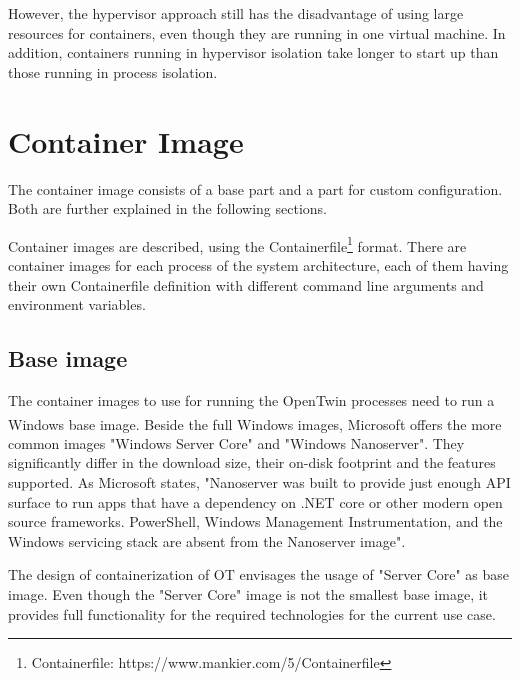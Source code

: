 However, the hypervisor approach still has the disadvantage of using large resources for containers, even though they are running in one virtual machine. In addition, containers running in hypervisor isolation take longer to start up than those running in process isolation\cite{RamosApolinario.2021}.




\section{Container Image}
The container image consists of a base part and a part for custom configuration. Both are further explained in the following sections.

Container images are described, using the Containerfile\footnote{Containerfile: https://www.mankier.com/5/Containerfile} format.
There are container images for each process of the system architecture, each of them having their own Containerfile definition with different command line arguments and environment variables.


\subsection{Base image}
The container images to use for running the OpenTwin processes need to run a \ac{Windows} base image. Beside the full \ac{Windows} images, Microsoft\textsuperscript{\tiny\textregistered} offers the more common images "\ac{Windows} Server Core" and "\ac{Windows} Nanoserver"\cite{MattbriggsMicrosoft.20230214}. They significantly differ in the download size, their on-disk footprint and the features supported\cite{MattbriggsMicrosoft.20230214}. As Microsoft states, "Nanoserver was built to provide just enough \ac{API} surface to run apps that have a dependency on .NET core or other modern open source frameworks. PowerShell, Windows Management Instrumentation, and the \ac{Windows} servicing stack are absent from the Nanoserver image"\cite{MattbriggsMicrosoft.20230214}.

The design of containerization of \ac{OT} envisages the usage of "Server Core" as base image. Even though the "Server Core" image is not the smallest base image, it provides full functionality for the required technologies for the current use case.


